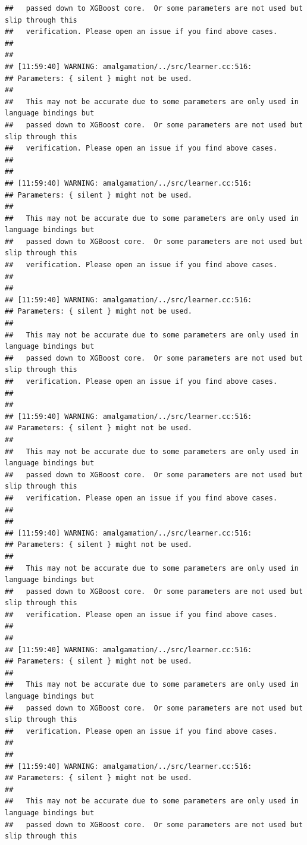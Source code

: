 \documentclass[AMS,STIX2COL]{WileyNJD-v2}\usepackage[]{graphicx}\usepackage[]{color}
\makeatletter
\newenvironment{kframe}{%
 \def\at@end@of@kframe{}%
 \ifinner\ifhmode%
  \def\at@end@of@kframe{\end{minipage}}%
  \begin{minipage}{\columnwidth}%
 \fi\fi%
 \def\FrameCommand##1{\hskip\@totalleftmargin \hskip-\fboxsep
 \colorbox{shadecolor}{##1}\hskip-\fboxsep
     \hskip-\linewidth \hskip-\@totalleftmargin \hskip\columnwidth}%
 \MakeFramed {\advance\hsize-\width
   \@totalleftmargin\z@ \linewidth\hsize
   \@setminipage}}%
 {\par\unskip\endMakeFramed%
 \at@end@of@kframe}
\newenvironment{knitrout}{}{} %
\makeatother
\begin{document}
\begin{knitrout}
\begin{kframe}
\begin{verbatim}
##   passed down to XGBoost core.  Or some parameters are not used but slip through this
##   verification. Please open an issue if you find above cases.
## 
## 
## [11:59:40] WARNING: amalgamation/../src/learner.cc:516: 
## Parameters: { silent } might not be used.
## 
##   This may not be accurate due to some parameters are only used in language bindings but
##   passed down to XGBoost core.  Or some parameters are not used but slip through this
##   verification. Please open an issue if you find above cases.
## 
## 
## [11:59:40] WARNING: amalgamation/../src/learner.cc:516: 
## Parameters: { silent } might not be used.
## 
##   This may not be accurate due to some parameters are only used in language bindings but
##   passed down to XGBoost core.  Or some parameters are not used but slip through this
##   verification. Please open an issue if you find above cases.
## 
## 
## [11:59:40] WARNING: amalgamation/../src/learner.cc:516: 
## Parameters: { silent } might not be used.
## 
##   This may not be accurate due to some parameters are only used in language bindings but
##   passed down to XGBoost core.  Or some parameters are not used but slip through this
##   verification. Please open an issue if you find above cases.
## 
## 
## [11:59:40] WARNING: amalgamation/../src/learner.cc:516: 
## Parameters: { silent } might not be used.
## 
##   This may not be accurate due to some parameters are only used in language bindings but
##   passed down to XGBoost core.  Or some parameters are not used but slip through this
##   verification. Please open an issue if you find above cases.
## 
## 
## [11:59:40] WARNING: amalgamation/../src/learner.cc:516: 
## Parameters: { silent } might not be used.
## 
##   This may not be accurate due to some parameters are only used in language bindings but
##   passed down to XGBoost core.  Or some parameters are not used but slip through this
##   verification. Please open an issue if you find above cases.
## 
## 
## [11:59:40] WARNING: amalgamation/../src/learner.cc:516: 
## Parameters: { silent } might not be used.
## 
##   This may not be accurate due to some parameters are only used in language bindings but
##   passed down to XGBoost core.  Or some parameters are not used but slip through this
##   verification. Please open an issue if you find above cases.
## 
## 
## [11:59:40] WARNING: amalgamation/../src/learner.cc:516: 
## Parameters: { silent } might not be used.
## 
##   This may not be accurate due to some parameters are only used in language bindings but
##   passed down to XGBoost core.  Or some parameters are not used but slip through this

\end{verbatim}
\end{kframe}
\end{knitrout}
\end{document}
